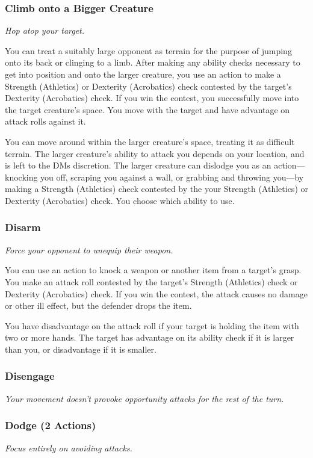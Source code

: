 \subsubsection{Climb onto a Bigger Creature}
    \textit{Hop atop your target.}

    You can treat a suitably large opponent as terrain for the purpose of jumping onto its back or clinging to a limb.
    After making any ability checks necessary to get into position and onto the larger creature, you use an action to make a Strength (Athletics) or Dexterity (Acrobatics) check contested by the target's Dexterity (Acrobatics) check.
    If you win the contest, you successfully move into the target creature's space.
    You move with the target and have advantage on attack rolls against it.

    You can move around within the larger creature's space, treating it as difficult terrain.
    The larger creature's ability to attack you depends on your location, and is left to the DMs discretion.
    The larger creature can dislodge you as an action—knocking you off, scraping you against a wall, or grabbing and throwing you—by making a Strength (Athletics) check contested by the your Strength (Athletics) or Dexterity (Acrobatics) check.
    You choose which ability to use.
\subsubsection{Disarm}
    \textit{Force your opponent to unequip their weapon.}

    You can use an action to knock a weapon or another item from a target's grasp.
    You make an attack roll contested by the target's Strength (Athletics) check or Dexterity (Acrobatics) check.
    If you win the contest, the attack causes no damage or other ill effect, but the defender drops the item.

    You have disadvantage on the attack roll if your target is holding the item with two or more hands.
    The target has advantage on its ability check if it is larger than you, or disadvantage if it is smaller.
\subsubsection{Disengage}
    \textit{Your movement doesn't provoke opportunity attacks for the rest of the turn.}
\subsubsection{Dodge (2 Actions)}
    \textit{Focus entirely on avoiding attacks.}

